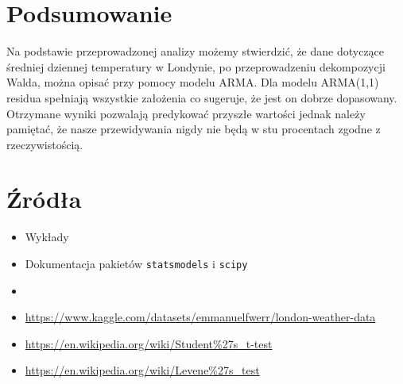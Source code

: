 \documentclass{article}
\theoremstyle{break}
\newcommand{\code}[1]{\colorbox{light-gray}{\texttt{#1}}}
\begin{document}
	\section{Podsumowanie}
	
	Na podstawie przeprowadzonej analizy możemy stwierdzić, że dane dotyczące średniej dziennej temperatury w Londynie, po przeprowadzeniu dekompozycji Walda, można opisać przy pomocy modelu ARMA. Dla modelu ARMA(1,1) residua spełniają wszystkie założenia co sugeruje, że jest on dobrze dopasowany. Otrzymane wyniki pozwalają predykować przyszłe wartości jednak należy pamiętać, że nasze przewidywania nigdy nie będą w stu procentach zgodne z rzeczywistością.
	
	\section{Źródła}
	\begin{itemize}
		\item Wykłady
		\item Dokumentacja pakietów \code{statsmodels} i \code{scipy}
		\item \url{}
		\item \url{https://www.kaggle.com/datasets/emmanuelfwerr/london-weather-data}
		\item \url{https://en.wikipedia.org/wiki/Student%27s_t-test}
		\item \url{https://en.wikipedia.org/wiki/Levene%27s_test}
		
	\end{itemize}
	
	
\end{document}
